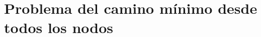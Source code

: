 \documentclass[aspectratio=169]{beamer}
\begin{document}
\section{Problema del camino m\'inimo desde todos los nodos}

\end{document}
